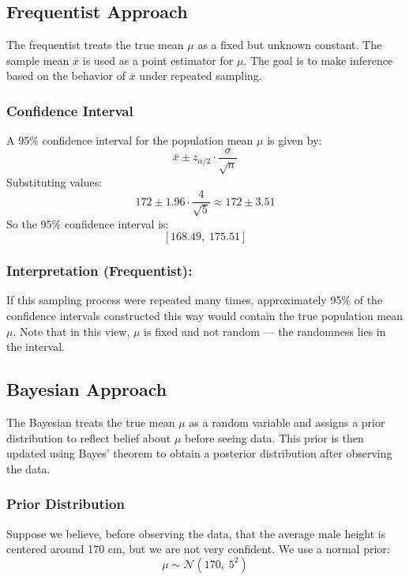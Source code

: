 \documentclass[twoside]{book}
\begin{document}
\subsection{Frequentist Approach}

The frequentist treats the true mean $\mu$ as a fixed but unknown constant. The sample mean $\overline{x}$ is used as a point estimator for $\mu$. The goal is to make inference based on the behavior of $\overline{x}$ under repeated sampling.

\subsubsection*{Confidence Interval}

A 95\% confidence interval for the population mean $\mu$ is given by:
\[
\overline{x} \pm z_{\alpha/2} \cdot \dfrac{\sigma}{\sqrt{n}}
\]
Substituting values:
\[
172 \pm 1.96 \cdot \dfrac{4}{\sqrt{5}} \approx 172 \pm 3.51
\]
So the 95\% confidence interval is:
\[
[168.49,\; 175.51]
\]

\subsubsection*{Interpretation (Frequentist):}

If this sampling process were repeated many times, approximately 95\% of the confidence intervals constructed this way would contain the true population mean $\mu$. Note that in this view, $\mu$ is fixed and not random — the randomness lies in the interval.

\vspace{1em}

\subsection{Bayesian Approach}

The Bayesian treats the true mean $\mu$ as a random variable and assigns a prior distribution to reflect belief about $\mu$ before seeing data. This prior is then updated using Bayes’ theorem to obtain a posterior distribution after observing the data.

\subsubsection*{Prior Distribution}

Suppose we believe, before observing the data, that the average male height is centered around 170 cm, but we are not very confident. We use a normal prior:
\[
\mu \sim \mathcal{N}(170,\; 5^2)
\]
\end{document}
